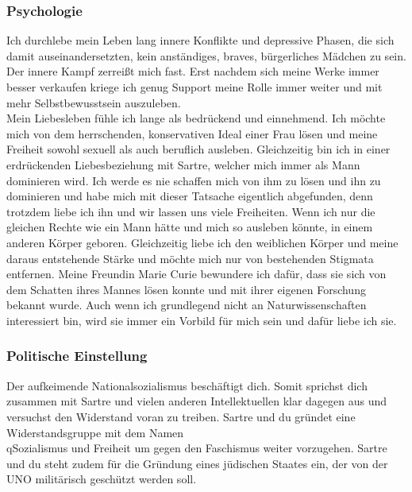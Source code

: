 \documentclass[12pt, a4paper, openany]{report}
\begin{document}
\subsubsection{Psychologie}

Ich durchlebe mein Leben lang innere Konflikte und depressive Phasen, die sich damit auseinandersetzten, kein anständiges, braves, bürgerliches Mädchen zu sein. Der innere Kampf zerreißt mich fast. Erst nachdem sich meine Werke immer besser verkaufen kriege ich genug Support meine Rolle immer weiter und mit mehr Selbstbewusstsein auszuleben. \\ 
Mein Liebesleben fühle ich lange als bedrückend und einnehmend. Ich möchte mich von dem  herrschenden, konservativen Ideal einer Frau lösen und meine Freiheit sowohl sexuell als auch beruflich ausleben. Gleichzeitig bin ich in einer erdrückenden Liebesbeziehung mit Sartre, welcher mich immer als Mann dominieren wird. Ich werde es nie schaffen mich von ihm zu lösen und ihn zu dominieren und habe mich mit dieser Tatsache eigentlich abgefunden, denn trotzdem liebe ich ihn und wir lassen uns viele Freiheiten.
Wenn ich nur die gleichen Rechte wie ein Mann hätte und mich so ausleben könnte, in einem anderen Körper geboren. Gleichzeitig liebe ich den weiblichen Körper und meine daraus entstehende Stärke und möchte mich nur von bestehenden Stigmata entfernen. Meine Freundin Marie Curie bewundere ich dafür, dass sie sich von dem Schatten ihres Mannes lösen konnte und mit ihrer eigenen Forschung bekannt wurde. Auch wenn ich grundlegend nicht an Naturwissenschaften interessiert bin, wird sie immer ein Vorbild für mich sein und dafür liebe ich sie. 



 
\subsubsection{Politische Einstellung} 

Der aufkeimende Nationalsozialismus beschäftigt dich. Somit sprichst dich zusammen mit Sartre und vielen anderen Intellektuellen klar dagegen aus und versuchst den Widerstand voran zu treiben. Sartre und du gründet eine Widerstandsgruppe mit dem Namen \\q{Sozialismus und Freiheit} um gegen den Faschismus weiter vorzugehen. Sartre und du steht zudem für die Gründung eines jüdischen Staates ein, der von der UNO militärisch geschützt werden soll. \\
\end{document}
